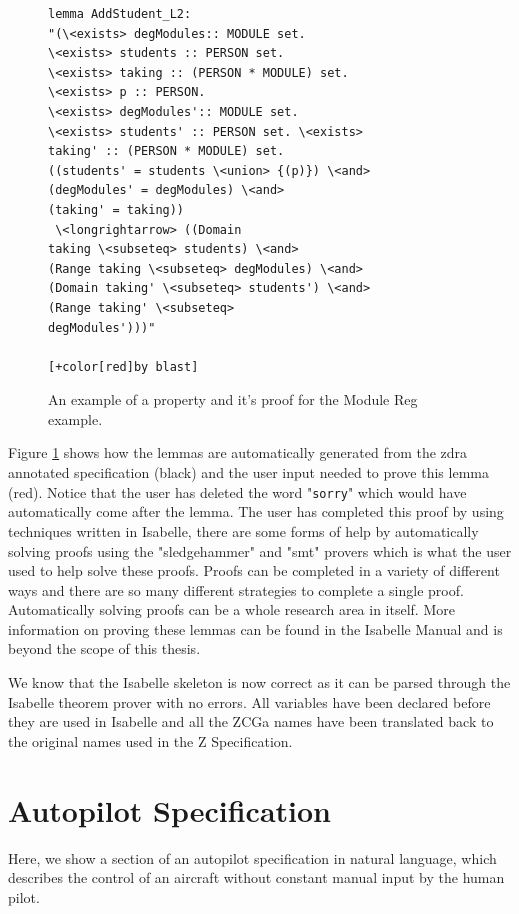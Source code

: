 \begin{figure}[H]
\begin{minipage}{0.45\textwidth}
\begin{scriptsize}
\begin{BVerbatim}[commandchars=+\[\]]
lemma AddStudent_L2: 
"(\<exists> degModules:: MODULE set. 
\<exists> students :: PERSON set. 
\<exists> taking :: (PERSON * MODULE) set. 
\<exists> p :: PERSON.
\<exists> degModules':: MODULE set. 
\<exists> students' :: PERSON set. \<exists>
taking' :: (PERSON * MODULE) set. 
((students' = students \<union> {(p)}) \<and>
(degModules' = degModules) \<and> 
(taking' = taking))
 \<longrightarrow> ((Domain
taking \<subseteq> students) \<and> 
(Range taking \<subseteq> degModules) \<and>
(Domain taking' \<subseteq> students') \<and> 
(Range taking' \<subseteq>
degModules')))"

[+color[red]by blast]
\end{BVerbatim}
\end{scriptsize}
\end{minipage}
\caption{An example of a property and it's proof for the Module Reg example. \label{fig:propertyproof}}
\end{figure}

Figure \ref{fig:propertyproof} shows how the lemmas are automatically generated from
the \gls{zdra} annotated specification (black) and the user input needed to
prove this lemma (red). Notice that the user has deleted the word
"\texttt{sorry}" which would have automatically come after the lemma.
The user has completed this proof by using techniques written in Isabelle, there are some forms of 
help by automatically solving proofs using the "sledgehammer" and "smt" provers which is what the 
user used to help solve these proofs.
Proofs can be completed in a variety of different ways and there are so many different strategies 
to complete a single proof. Automatically solving proofs can be a whole research area in itself.
More information on proving these lemmas can be found in the Isabelle Manual
\cite{isabelle} and is beyond the scope of this thesis.

We know that the Isabelle skeleton is now correct as it can be parsed through the 
Isabelle theorem prover with no errors.
All variables have been declared before they are used in Isabelle and all the ZCGa names
have been translated back to the original names used in the Z Specification.

\section{Autopilot Specification}
Here, we show a section of an autopilot specification \cite{Butler96} in natural
language, which describes
the control of an aircraft without constant manual input by the human pilot.

